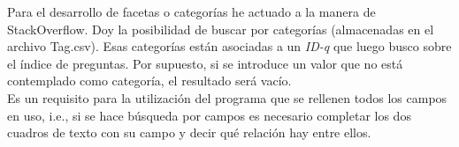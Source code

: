 Para el desarrollo de facetas o categorías he actuado a la manera de StackOverflow. Doy la posibilidad de buscar por categorías (almacenadas en el archivo Tag.csv). Esas categorías están asociadas a un \textit{ID-q} que luego busco sobre el índice de preguntas. Por supuesto, si se introduce un valor que no está contemplado como categoría, el resultado será vacío.
\\

Es un requisito para la utilización del programa que se rellenen todos los campos en uso, i.e., si se hace búsqueda por campos es necesario completar los dos cuadros de texto con su campo y decir qué relación hay entre ellos.

